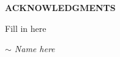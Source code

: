 \newpage
{\centering \bf ACKNOWLEDGMENTS \par}

Fill in here

\vspace*{\fill}

\begin{flushright}
{\it $\sim$ Name here $\qquad \qquad$}
\end{flushright}
